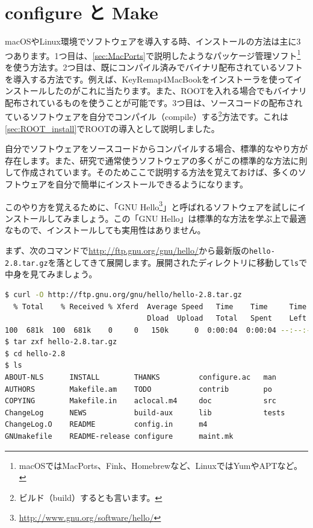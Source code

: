 \chapter{configure と Make}
\label{chap:configure}
macOSやLinux環境でソフトウェアを導入する時、インストールの方法は主に3つあります。1つ目は、\ref{sec:MacPorts}で説明したようなパッケージ管理ソフト\footnote{macOSではMacPorts、Fink、Homebrewなど、LinuxではYumやAPTなど。}を使う方法す。2つ目は、既にコンパイル済みでバイナリ配布されているソフトを導入する方法です。例えば、KeyRemap4MacBookをインストーラを使ってインストールしたのがこれに当たります。また、ROOTを入れる場合でもバイナリ配布されているものを使うことが可能です。3つ目は、ソースコードの配布されているソフトウェアを自分でコンパイル（compile）する\footnote{ビルド（build）するとも言います。}方法です。これは\ref{sec:ROOT_install}でROOTの導入として説明しました。

自分でソフトウェアをソースコードからコンパイルする場合、標準的なやり方が存在します。また、研究で通常使うソフトウェアの多くがこの標準的な方法に則して作成されています。そのためここで説明する方法を覚えておけば、多くのソフトウェアを自分で簡単にインストールできるようになります。

このやり方を覚えるために、「GNU Hello\footnote{\url{http://www.gnu.org/software/hello/}}」と呼ばれるソフトウェアを試しにインストールしてみましょう。この「GNU Hello」は標準的な方法を学ぶ上で最適なもので、インストールしても実用性はありません。

まず、次のコマンドで\url{http://ftp.gnu.org/gnu/hello/}から最新版の\texttt{hello-2.8.tar.gz}を落としてきて展開します。展開されたディレクトリに移動して\texttt{ls}で中身を見てみましょう。

\begin{lstlisting}[language=bash]
$ curl -O http://ftp.gnu.org/gnu/hello/hello-2.8.tar.gz
  % Total    % Received % Xferd  Average Speed   Time    Time     Time  Current
                                 Dload  Upload   Total   Spent    Left  Speed
100  681k  100  681k    0     0   150k      0  0:00:04  0:00:04 --:--:--  166k
$ tar zxf hello-2.8.tar.gz
$ cd hello-2.8 
$ ls
ABOUT-NLS      INSTALL        THANKS         configure.ac   man
AUTHORS        Makefile.am    TODO           contrib        po
COPYING        Makefile.in    aclocal.m4     doc            src
ChangeLog      NEWS           build-aux      lib            tests
ChangeLog.O    README         config.in      m4
GNUmakefile    README-release configure      maint.mk
\end{lstlisting}

